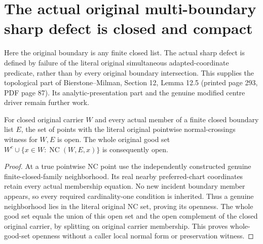 \section{The actual original multi-boundary sharp defect is closed and compact}

Here the original boundary is any finite closed list. The actual sharp
defect is defined by failure of the literal original simultaneous
adapted-coordinate predicate, rather than by every original boundary
intersection. This supplies the topological part of
Bierstone--Milman\cite{bierstone-milman97-invent-math}, Section 12,
Lemma 12.5 (printed page 293, PDF page 87). Its analytic-presentation part
and the genuine modified centre driver remain further work.

\begin{lemma}
\label{hir:sharp-original-multiboundary-pointwise-nc-open}
\leanok
For closed original carrier $W$ and every actual member of a finite closed
boundary list $E$, the set of points with the literal original pointwise
normal-crossings witness for $W,E$ is open. The whole original good set
$W^c\cup\{x\in W:\operatorname{NC}(W,E,x)\}$ is consequently open.
\end{lemma}
\begin{proof}
At a true pointwise NC point use the independently constructed genuine
finite-closed-family neighborhood. Its real nearby preferred-chart
coordinates retain every actual membership equation. No new incident
boundary member appears, so every required cardinality-one condition is
inherited. Thus a genuine neighborhood lies in the literal original NC
set, proving its openness. The whole good set equals the union of this
open set and the open complement of the closed original carrier, by
splitting on original carrier membership. This proves whole-good-set
openness without a caller local normal form or preservation witness.
\end{proof}


